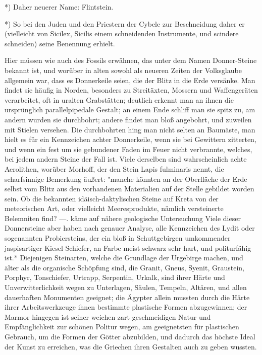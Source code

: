\documentclass[a4paper, 11pt, oneside, polutonikogreek, german]{article}
\begin{document}
*) Daher neuerer Name: Flintstein.

*) So bei den Juden und den Priestern der Cybele zur Beschneidung daher er (vielleicht von Sicilex, Sicilis einem schneidenden Instrumente, und scindere schneiden) seine Benennung erhielt.

Hier müssen wie auch des Fossils erwähnen, das unter dem Namen Donner-Steine bekannt ist, und worüber in alten sowohl als neueren Zeiten der Volksglaube allgemein war, dass es Donnerkeile seien, die der Blitz in die Erde versänke. Man findet sie häufig in Norden, besonders zu Streitäxten, Mossern und Waffengeräten verarbeitet, oft in uralten Grabstätten; deutlich erkennt man an ihnen die ursprünglich parallelpipedale Gestalt; an einem Ende schliff man sie spitz zu, am andern wurden sie durchbohrt; andere findet man bloß angebohrt, und zuweilen mit Stielen versehen. Die durchbohrten hing man nicht selten an Baumäste, man hielt es für ein Kennzeichen achter Donnerkeile, wenn sie bei Gewittern zitterten, und wenn ein fest um sie gebundener Faden im Feuer nicht verbrannte, welches, bei jedem andern Steine der Fall ist. Viele derselben sind wahrscheinlich achte Aerolithen, worüber Morhoff, der den Stein Lapis fulminaris nennt, die scharfsinnige Bemerkung äußert: "manche könnten an der Oberfläche der Erde selbst vom Blitz aus den vorhandenen Materialien auf der Stelle gebildet worden sein. Ob die bekannten idäisch-daktylischen Steine auf Kreta von der meteorischen Art, oder vielleicht Meeresprodukte, nämlich versteinerte Belemniten find? ---. käme auf nähere geologische Untersuchung Viele dieser Donnersteine aber haben nach genauer Analyse, alle Kennzeichen des Lydit oder sogenannten Probiersteins, der ein bloß in Schuttgebirgen umkommender jaspisartiger Kiesel-Schiefer, an Farbe meist schwarz sehr hart, und politurfähig ist.* Diejenigen Steinarten, welche die Grundlage der Urgebirge machen, und älter als die organische Schöpfung sind, die Granit, Gneus, Syenit, Graustein, Porphyr, Tonschiefer, Urtrapp, Serpentin, Urkalk, sind ihrer Härte und Unverwitterlichkeit wegen zu Unterlagen, Säulen, Tempeln, Altären, und allen dauerhaften Monumenten geeignet; die Ägypter allein mussten durch die Härte ihrer Arbeitswerkzeuge ihnen bestimmte plastische Formen abzugewinnen; der Marmor hingegen ist seiner weichen zart geschmeidigen Natur und Empfänglichkeit zur schönen Politur wegen, am geeignetsten für plastischen Gebrauch, um die Formen der Götter abzubilden, und dadurch das höchste Ideal der Kunst zu erreichen, was die Griechen ihren Gestalten auch zu geben wussten.
\end{document}
